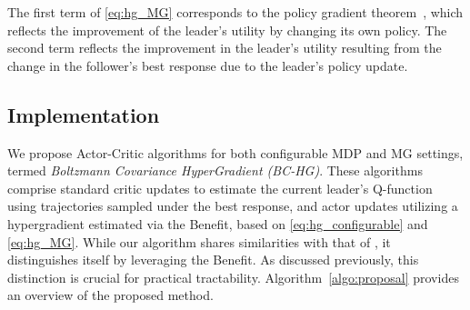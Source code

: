 \documentclass[letterpaper]{article} %
\providecommand{\E}{\mathbb{E}} %
\newtheorem{theorem}{Theorem}
\begin{document}

The first term of \eqref{eq:hg_MG} corresponds to the policy gradient theorem~\citep{Sutton1999-su,Sutton2018-jf}, which reflects the improvement of the leader's utility by changing its own policy.
The second term reflects the improvement in the leader's utility resulting from the change in the follower's best response due to the leader's policy update. 

\subsection{Implementation}


We propose Actor-Critic algorithms for both configurable MDP and MG settings, termed \emph{Boltzmann Covariance HyperGradient (BC-HG)}. 
These algorithms comprise standard critic updates to estimate the current leader's Q-function using trajectories sampled under the best response, and actor updates utilizing a hypergradient estimated via the Benefit, based on \eqref{eq:hg_configurable} and \eqref{eq:hg_MG}. 
While our algorithm shares similarities with that of \citet{Thoma2024-em}, it distinguishes itself by leveraging the Benefit. 
As discussed previously, this distinction is crucial for practical tractability. 
Algorithm~\ref{algo:proposal} provides an overview of the proposed method.
\end{document}
